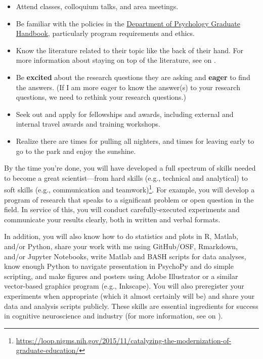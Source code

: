 \documentclass[letterpaper,12pt,oneside]{memoir}
\begin{document}
\begin{itemize}
\item Attend classes, colloquium talks, and area meetings.
\item Be familiar with the policies in the \href{https://docs.google.com/document/d/1hoxVN1ol7ZGB10_9N0k8yVxkRDJLcMVYGTp-Nwgbm94/edit}{Department of Psychology Graduate Handbook}, particularly program requirements and ethics.
\item Know the literature related to their topic like the back of their hand. For more information about staying on top of the literature, see  on .
\item Be \textbf{excited} about the research questions they are asking and \textbf{eager} to find the answers. (If I am more eager to know the answer(s) to your research questions, we need to rethink your research questions.)
\item Seek out and apply for fellowships and awards, including external and internal travel awards and training workshops.
\item Realize there are times for pulling all nighters, and times for leaving early to go to the park and enjoy the sunshine.
\end{itemize}

By the time you're done, you will have developed a full spectrum of skills needed to become a great scientist---from hard skills (e.g., technical and analytical) to soft skills (e.g., communication and teamwork)\footnote{\url{https://loop.nigms.nih.gov/2015/11/catalyzing-the-modernization-of-graduate-education/}}. For example, you will develop a program of research that speaks to a significant problem or open question in the field. In service of this, you will conduct carefully-executed experiments and communicate your results clearly, both in written and verbal formats. 

In addition, you will also know how to do statistics and plots in R, Matlab, and/or Python, share your work with me using GitHub/OSF, Rmarkdown, and/or Jupyter Notebooks, write Matlab and BASH scripts for data analyses, know enough Python to navigate presentation in PsychoPy and do simple scripting, and make figures and posters using Adobe Illustrator or a similar vector-based graphics program (e.g., Inkscape). You will also preregister your experiments when appropriate (which it almost certainly will be) and share your data and analysis scripts publicly. These skills are essential ingredients for success in cognitive neuroscience and industry (for more information, see  on ).
\end{document}
